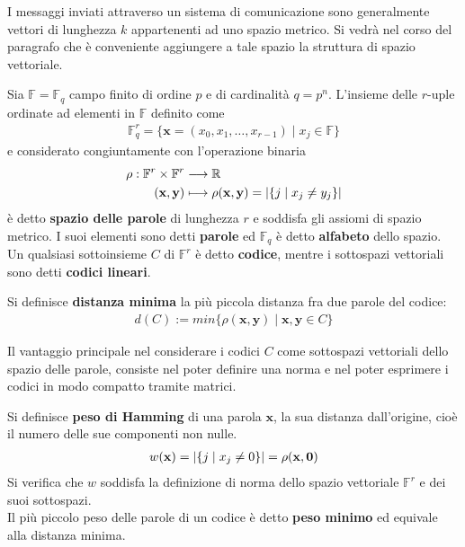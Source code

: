 I messaggi inviati attraverso un sistema di comunicazione sono generalmente vettori di lunghezza $k$ appartenenti ad uno spazio metrico. Si vedrà nel corso del paragrafo che è conveniente aggiungere a tale spazio la struttura di spazio vettoriale. 
\begin{definizione}
   Sia $\mathbb{F} = \mathbb{F}_{q}$ campo finito di ordine $p$ e di cardinalità $q=p^n$. L'insieme delle $r$-uple ordinate ad elementi in $\mathbb{F}$ definito come
   \begin{align*}
      \mathbb{F}_{q}^{r} = \lbrace \mathbf{x} = (x_{0},x_{1}, \dots , x_{r-1}) \mid x_{j} \in \mathbb{F} \rbrace
   \end{align*}
   e considerato congiuntamente con l'operazione binaria
   \begin{align*}
       \rho: \mathbb{F}^{r} \times \mathbb{F}^{r}  &\longrightarrow  \mathbb{R}   \\
              (\mathbf{x},\mathbf{y}) &\longmapsto  \rho(\mathbf{x},\mathbf{y})  
              = \arrowvert \lbrace j \mid x_j \neq y_j \rbrace \arrowvert
   \end{align*}
   è detto {\bf spazio delle parole} di lunghezza $r$ e soddisfa gli assiomi di spazio metrico. I suoi elementi sono detti {\bf parole} ed $\mathbb{F}_{q}$ è detto {\bf alfabeto} dello spazio. \\
   Un qualsiasi sottoinsieme $C$ di $\mathbb{F}^{r} $ è detto {\bf codice}, mentre i sottospazi vettoriali sono detti {\bf codici lineari}. 
\end{definizione}   
\begin{definizione}
   Si definisce {\bf distanza minima} la più piccola distanza fra due parole del codice:
   \begin{align*}
      d(C) 
      := min\lbrace  \rho(\mathbf{x},\mathbf{y})    \mid \mathbf{x},\mathbf{y} \in C \rbrace
   \end{align*}   
\end{definizione}
\noindent
Il vantaggio principale nel considerare i codici $C$ come sottospazi vettoriali dello spazio delle parole, consiste nel poter definire una norma e nel poter esprimere i codici in modo compatto tramite matrici.
\begin{definizione}
   Si definisce {\bf peso di Hamming} di una parola $\mathbf{x}$, la sua distanza dall'origine, cioè il numero delle sue componenti non nulle.
   \begin{align*}   
      w(\mathbf{x}) = \arrowvert \lbrace j \mid x_j \neq 0 \rbrace \arrowvert = \rho(\mathbf{x},\mathbf{0})
   \end{align*}   
   Si verifica che $w$ soddisfa la definizione di norma dello spazio vettoriale $\mathbb{F}^{r}$ e dei suoi sottospazi.\\
   Il più piccolo peso delle parole di un codice è detto {\bf peso minimo} ed equivale alla distanza minima.
\end{definizione}
